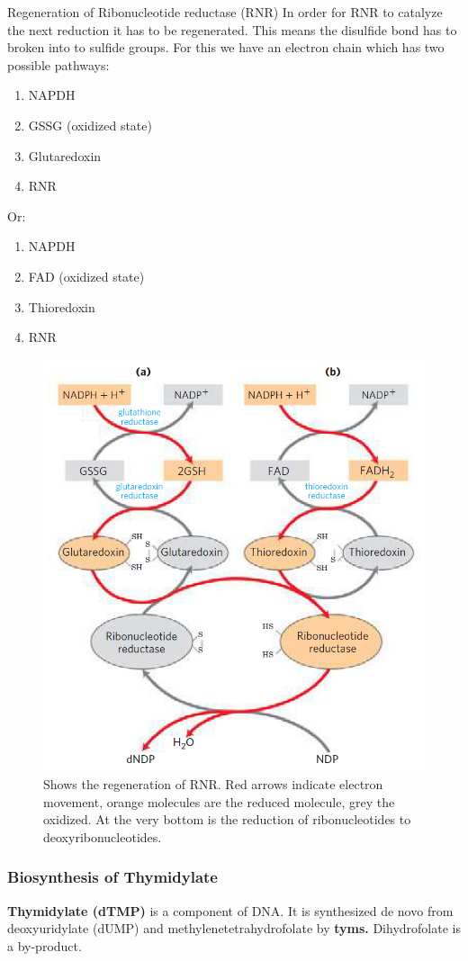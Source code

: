 \documentclass[../main.tex]{subfiles}
\begin{document}
\begin{RemarkWithTitel}{Regeneration of Ribonucleotide reductase (RNR)}
	In order for RNR to catalyze the next reduction it has to be regenerated. This means the disulfide bond has to broken into to sulfide groups. For this we have an electron chain which has two possible pathways:
	\begin{enumerate}
		\item NAPDH
		\item GSSG (oxidized state)
		\item Glutaredoxin
		\item RNR
	\end{enumerate}
	Or:
	\begin{enumerate}
		\item NAPDH
		\item FAD (oxidized state)
		\item Thioredoxin
		\item RNR
	\end{enumerate}
	
	\begin{figure}[H]
		\centering
		\includegraphics[width=0.5\linewidth]{rnr_regen}
		\caption{Shows the regeneration of RNR. Red arrows indicate electron movement, orange molecules are the reduced molecule, grey the oxidized. At the very bottom is the reduction of ribonucleotides to deoxyribonucleotides.}
		\label{fig:rnrregen}
	\end{figure}
	
\end{RemarkWithTitel}


\subsubsection{Biosynthesis of Thymidylate}

\textbf{\gls{Thymidylate (dTMP)}} is a component of DNA. It is synthesized de novo from deoxyuridylate (dUMP) and methylenetetrahydrofolate by \textbf{\gls{tyms}.} Dihydrofolate is a by-product. \\
\end{document}
